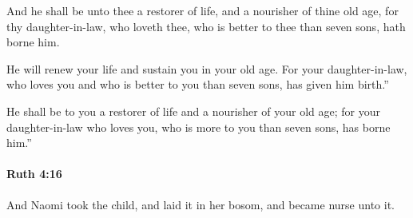 			\begin{versebox}
					\item[BHS] 
					\item[LXX] 
					\item[ASV] And he shall be unto thee a restorer of life, and a nourisher of thine old age, for thy daughter-in-law, who loveth thee, who is better to thee than seven sons, hath borne him.
					\item[NIV] He will renew your life and sustain you in your old age. For your daughter-in-law, who loves you and who is better to you than seven sons, has given him birth.”
					\item[NRSV] He shall be to you a restorer of life and a nourisher of your old age; for your daughter-in-law who loves you, who is more to you than seven sons, has borne him.”
			\end{versebox}

		\paragraph{Ruth 4:16} %
			\label{RUTH-4-16}

			And Naomi took the child, and laid it in her bosom, and became nurse unto it.

